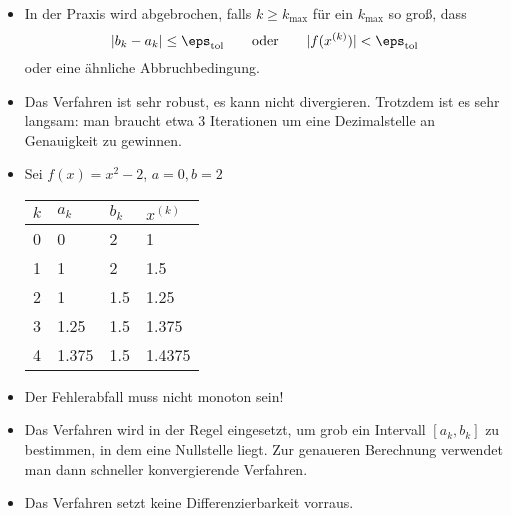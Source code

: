 \documentclass[11pt]{scrartcl}
\begin{document}
\begin{nt*}
	\begin{itemize}
		\item
			In der Praxis wird abgebrochen, falls $k \ge k_{\text{max}}$ für ein $k_{\text{max}}$ so groß, dass
			\[
				|b_k -a_k| \le \eps_{\text{tol}}
				\qquad
				\text{oder}
				\qquad
				|f(x^{(k)})| < \eps_{\text{tol}}
			\]
			oder eine ähnliche Abbruchbedingung.
		\item
			Das Verfahren ist sehr robust, es kann nicht divergieren.
			Trotzdem ist es sehr langsam: man braucht etwa 3 Iterationen um eine Dezimalstelle an Genauigkeit zu gewinnen.
		\item
			Sei $f(x) = x^2 - 2$, $a=0, b=2$
			\begin{table}[!ht]
				\centering
				\begin{tabular}{c|l|l|l}
					$k$ & $a_k$ & $b_k$ & $x^{(k)}$ \\ \hline
					0 & 0 & 2 & 1 \\
					1 & 1 & 2 & 1.5 \\
					2 & 1 & 1.5 & 1.25 \\
					3 & 1.25 & 1.5 & 1.375 \\
					4 & 1.375 & 1.5 & 1.4375 
				\end{tabular}
			\end{table}
		\item
			Der Fehlerabfall muss nicht monoton sein!
		\item
			Das Verfahren wird in der Regel eingesetzt, um grob ein Intervall $[a_k,b_k]$ zu bestimmen, in dem eine Nullstelle liegt.
			Zur genaueren Berechnung verwendet man dann schneller konvergierende Verfahren.
		\item
			Das Verfahren setzt keine Differenzierbarkeit vorraus.
	\end{itemize}
\end{nt*}
\end{document}
